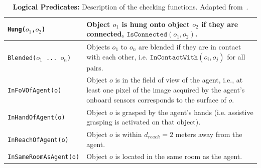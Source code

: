 \begin{table}[!htbp]
\begin{center}
{\begin{tabular}{ | m{} | m{} | }
\hline
\texttt{Hung($o_1$,$o_2$)} & Object $o_1$ is hung onto object $o_2$ if they are connected, $\texttt{IsConnected}(o_1, o_2)$.\\
\hline
\texttt{Blended($o_1$ ... $o_n$)} & Objects $o_1$ to $o_n$ are blended if they are in contact with each other, i.e. $\texttt{InContactWith}(o_i, o_j)$ for all pairs.\\
\hline
\texttt{InFoVOfAgent(o)} & Object $o$ is in the field of view of the agent, i.e., at least one pixel of the image acquired by the agent's onboard sensors corresponds to the surface of $o$.\\
\hline
\texttt{InHandOfAgent(o)} & Object $o$ is grasped by the agent's hands (i.e. assistive grasping is activated on that object).\\
\hline
\texttt{InReachOfAgent(o)} & Object $o$ is within $d_\mathit{reach}=2$ meters away from the agent.\\
\hline
\texttt{InSameRoomAsAgent(o)} & Object $o$ is located in the same room as the agent.\\
\hline
\end{tabular}
}
\vspace{3pt}
\caption{\textbf{Logical Predicates:} Description of the checking functions. Adapted from~\cite{li2021ig2}.}
\label{table:obj_pred_checking}
\end{center}
\end{table}